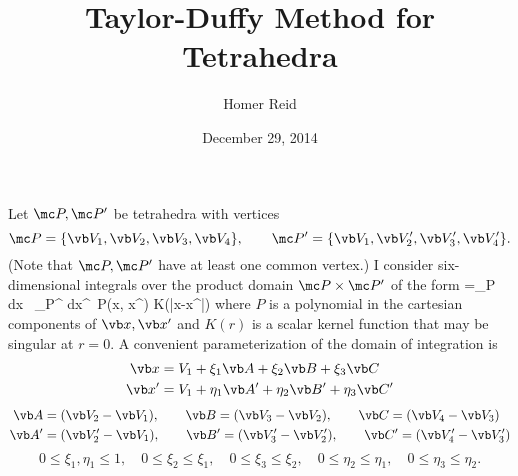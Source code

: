 \documentclass[letterpaper]{article}
\title{Taylor-Duffy Method for Tetrahedra}
\author {Homer Reid}
\date {December 29, 2014}
\begin{document}
\pagestyle{myheadings}
\maketitle

\tableofcontents

Let $\mc P, \mc P^\prime$ be tetrahedra with vertices
$$ \mc P=\{\vb V_1, \vb V_2, \vb V_3, \vb V_4\}, \qquad 
   \mc P^\prime=\{\vb V_1, \vb V_2^\prime, \vb V_3^\prime, \vb V_4^\prime\}.
$$
(Note that $\mc P, \mc P^\prime$ have at least one common vertex.)
I consider six-dimensional integrals over the product 
domain $\mc P\times \mc P^\prime$ of the form
{
=\int_{\mc P} d\vb x \, \int_{\mc P^\prime} d\vb x^\prime \, 
  P(\vb x, \vb x^\prime) K(|\vb x-\vb x^\prime|)
}
where $P$ is a polynomial in the cartesian components of 
$\vb x, \vb x^\prime$ and $K(r)$ is a scalar kernel function that
may be singular at $r=0$. A convenient parameterization of the 
domain of integration is 
\begin{align*}
 \vb x &= V_1 + \xi_1 \vb A
              + \xi_2 \vb B
              + \xi_3 \vb C
\\
 \vb x^\prime &= V_1 + \eta_1 \vb A^\prime
                     + \eta_2 \vb B^\prime
                     + \eta_3 \vb C^\prime
\end{align*}
\begin{align*}
 \vb A&=(\vb V_2-\vb V_1), \qquad 
 \vb B=(\vb V_3-\vb V_2),  \qquad
 \vb C=(\vb V_4-\vb V_3)
\\
 \vb A^\prime&=(\vb V_2^\prime-\vb V_1),       \qquad 
 \vb B^\prime=(\vb V_3^\prime-\vb V_2^\prime), \qquad
 \vb C^\prime=(\vb V_4^\prime-\vb V_3^\prime)
\end{align*}
$$
      0 \le \xi_1, \eta_1 \le 1,
\quad 0 \le \xi_2 \le \xi_1,
\quad 0 \le \xi_3 \le \xi_2,
\quad 0 \le \eta_2 \le \eta_1,
\quad 0 \le \eta_3 \le \eta_2.
$$
\end{document}
